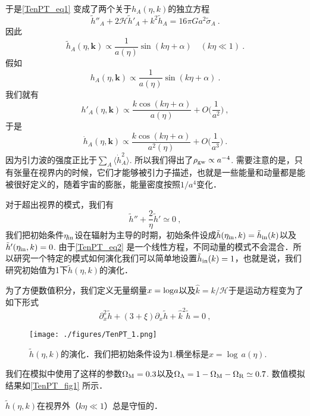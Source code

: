 于是\autoref{TenPT_eq1} 变成了两个关于$h_A(\eta,k)$的独立方程
\begin{equation}\label{TenPT_eq2}
\tilde h''_A + 2 \mathcal H \tilde h'_A + k^2\tilde h_A = 16 \pi G a^2 \tilde \sigma_A ~.
\end{equation}
因此
\begin{equation}
\tilde h_A(\eta,\mathbf k) \propto \frac{1}{a(\eta)} \sin(k\eta+\alpha)  \quad (k\eta \ll 1) ~.
\end{equation}
假如
\begin{equation}
h_A(\eta,\mathbf k) \propto \frac{1}{a(\eta)} \sin(k\eta+\alpha)   ~.
\end{equation}
我们就有
\begin{equation}
h'_A(\eta,\mathbf k) \propto \frac{k \cos(k\eta+\alpha)}{a(\eta)} + O \bigg( \frac{1}{a^2} \bigg) ~,
\end{equation}
于是
\begin{equation}
\dot h_A (\eta,\mathbf k) \propto \frac{k\cos(k\eta+\alpha)}{a^2 (\eta)} + O \bigg( \frac{1}{a^3} \bigg)~.
\end{equation}
因为引力波的强度正比于$\sum_A\langle \dot h_A^2 \rangle$. 所以我们得出了$\rho_{\rm gw} \propto a^{-4}$. 需要注意的是，只有张量在视界内的时候，它们才能够被引力子描述，也就是一些能量和动量都是能被很好定义的，随着宇宙的膨胀，能量密度按照$1/a^4$变化．

对于超出视界的模式，我们有
\begin{equation}
\tilde h'' + \frac{2}{\eta} \tilde h' \simeq 0 ~,
\end{equation}
我们把初始条件$\eta_{\rm in}$设在辐射为主导的时期，初始条件设成$\tilde h(\eta_{\rm in},k) = \tilde h_{\rm in} (k)$以及$\tilde h'(\eta_{\rm in},k) = 0$. 由于\autoref{TenPT_eq2} 是一个线性方程，不同动量的模式不会混合．所以研究一个特定的模式如何演化我们可以简单地设置$\tilde h_{\rm in}(k) = 1$，也就是说，我们研究初始值为1下$\tilde h({\eta,k})$的演化．

为了方便数值积分，我们定义无量纲量$x = {\rm log} a$以及$\hat k = k/\mathcal H$于是运动方程变为了如下形式
\begin{equation}
\partial^2_x \tilde h + (3+\xi) \partial_x \tilde h + \hat k^2 \tilde h = 0 ~,
\end{equation}
\begin{figure}[ht]
\centering
\texttt{[image: ./figures/TenPT\_1.png]}
\caption{$\tilde h(\eta,k)$的演化．我们把初始条件设为1.横坐标是$x = {\log} \, a (\eta).$} \label{TenPT_fig1}
\end{figure}
我们在模拟中使用了这样的参数$\Omega_{\rm M}=0.3$以及$\Omega_{\Lambda} = 1 - \Omega_{\rm M} - \Omega_{\rm R} \simeq 0.7$. 数值模拟结果如\autoref{TenPT_fig1} 所示．

$\tilde h(\eta,k)$在视界外（$k\eta\ll 1$）总是守恒的．



















